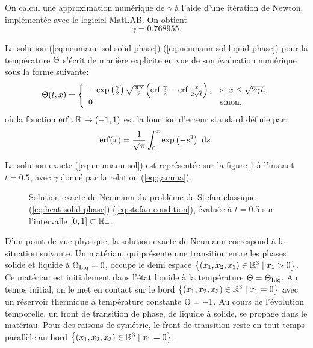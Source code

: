 On calcul une approximation numérique de $\gamma$ à l'aide d'une
itération de Newton, implémentée avec le logiciel MatLAB\textregistered. On obtient
\begin{equation}\label{eq:gamma}
  \gamma =\num{0.768955}.
\end{equation}

La solution
(\ref{eq:neumann-sol-solid-phase})-(\ref{eq:neumann-sol-liquid-phase})
pour la température $\Theta$ s'écrit de manière explicite
en vue de son évaluation numérique sous la forme suivante:
\begin{equation}\label{eq:neumann-sol}
  \temperature(t, x) = \left\{
  \begin{array}{ll}
    -\exp\parent{\frac{\gamma}{2}}\sqrt{\frac{\pi\gamma}{2}} %
    \parent{\erf{\frac{\gamma}{2}} - \erf{\frac{x}{2\sqrt{t}}}}, %
    & \text{si } x \leq \sqrt{2\gamma t},\\
    0 %
    & \text{sinon,}
  \end{array}
  \right.
\end{equation}
où la fonction $\operatorname{erf}:\mathbb R\to(-1,1)$ est la fonction d'erreur
standard définie par:
\begin{equation}
  \operatorname{erf}(x) = \frac{1}{\sqrt \pi}\int_0^x \exp\left( -s^2 \right)\,\,\mathrm ds.
\end{equation}

La solution exacte (\ref{eq:neumann-sol}) est représentée sur la
figure \ref{fig:neumann-sol} à l'instant $t = 0.5$, avec $\gamma$
donné par la relation (\ref{eq:gamma}).

\begin{figure}
  \begin{center}
    
    \caption{Solution exacte de Neumann du problème de Stefan classique
      (\ref{eq:heat-solid-phase})-(\ref{eq:stefan-condition}), évaluée
      à $t = 0.5$ sur l'intervalle $[0,1]\subset \mathbb R_+$.}
    \label{fig:neumann-sol}
  \end{center}
\end{figure}

D'un point de vue physique, la solution exacte de Neumann correspond à
la situation suivante. Un matériau, qui présente une transition entre
les phases solide et liquide à $\Theta_\text{Liq} = 0$, occupe le demi espace
$\left\{ (x_1, x_2, x_3)\in \mathbb R^3 \mid x_1 > 0 \right\}$. Ce matériau
est initialement dans l'état liquide à la température $\Theta =
\Theta_\text{Liq}$. Au temps initial, on le met en contact sur le bord
$\left\{ (x_1, x_2, x_3)\in\mathbb R^3 \mid x_1 = 0 \right\}$ avec un
réservoir thermique à température constante $\Theta = -1$. Au
cours de l'évolution temporelle, un front de transition de phase, de
liquide à solide, se propage dans le matériau. Pour des raisons de
symétrie, le front de transition reste en tout temps parallèle au
bord $\left\{ (x_1, x_2, x_3)\in\mathbb R^3 \mid x_1 = 0 \right\}$.

